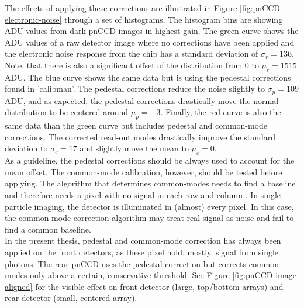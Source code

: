 %
The effects of applying these corrections are illustrated in Figure \ref{fig:pnCCD-electronic-noise} through a set of histograms. The histogram bins are showing ADU values from dark pnCCD images in highest gain. The green curve shows the ADU values of a raw detector image where no corrections have been applied and the electronic noise response from the chip has a standard deviation of $\sigma_{r}=136$. Note, that there is also a significant offset of the distribution from 0 to $\mu_{r}=1515$ ADU. The blue curve shows the same data but is using the pedestal corrections found in 'calibman'. The pedestal corrections reduce the noise slightly to $\sigma_{p}=109$ ADU, and as expected, the pedestal corrections drastically move the normal distribution to be centered around $\mu_{p}=-3$. Finally, the red curve is also the same data than the green curve but includes pedestal and common-mode corrections. The corrected read-out modes drastically improve the standard deviation to $\sigma_{c}=17$ and slightly move the mean to $\mu_{c}=0$.\\[1\baselineskip]
%
As a guideline, the pedestal corrections should be always used to account for the mean offset. The common-mode calibration, however, should be tested before applying. The algorithm that determines common-modes needs to find a baseline and therefore needs a pixel with no signal in each row and column  \citep{Hantke-Foucard-2016-PC}. In single-particle imaging, the detector is illuminated in (almost) every pixel. In this case, the common-mode correction algorithm may treat real signal as noise and fail to find a common baseline.\\[1\baselineskip]
%
In the present thesis, pedestal and common-mode correction has always been applied on the front detectors, as these pixel hold, mostly, signal from single photons. The rear pnCCD uses the pedestal correction but corrects common-modes only above a certain, conservative threshold. See Figure \ref{fig:pnCCD-image-aligned} for the visible effect on front detector (large, top/bottom arrays) and rear detector (small, centered array).\\
%
%
%
%
%
%
